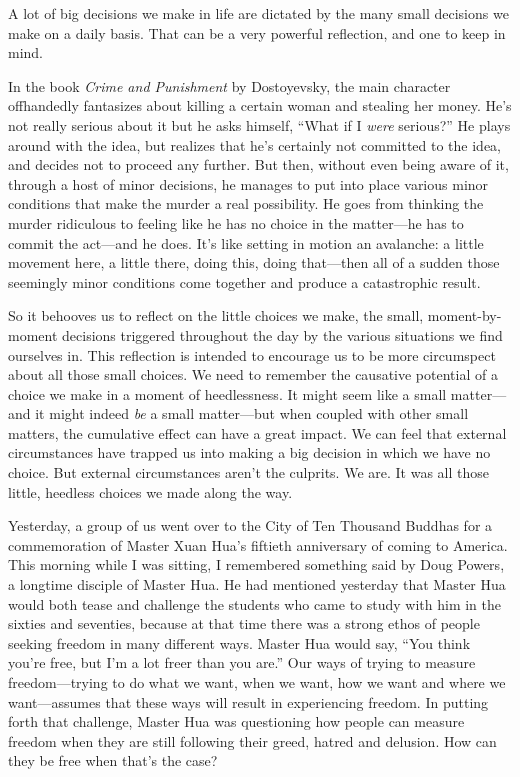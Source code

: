 
A lot of big decisions we make in life are dictated by the many small 
decisions we make on a daily basis. That can be a very powerful 
reflection, and one to keep in mind.

In the book \emph{Crime and Punishment} by Dostoyevsky, the main 
character offhandedly fantasizes about killing a certain woman and 
stealing her money. He's not really serious about it but he asks 
himself, ``What if I \emph{were} serious?'' He plays around with the 
idea, but realizes that he's certainly not committed to the idea, and 
decides not to proceed any further. But then, without even being aware 
of it, through a host of minor decisions, he manages to put into place 
various minor conditions that make the murder a real possibility. He 
goes from thinking the murder ridiculous to feeling like he has no 
choice in the matter---he has to commit the act---and he does. It's 
like setting in motion an avalanche: a little movement here, a little 
there, doing this, doing that---then all of a sudden those seemingly 
minor conditions come together and produce a catastrophic result.

So it behooves us to reflect on the little choices we make, the small, 
moment-by-moment decisions triggered throughout the day by the various 
situations we find ourselves in. This reflection is intended to 
encourage us to be more circumspect about all those small choices. We 
need to remember the causative potential of a choice we make in a 
moment of heedlessness. It might seem like a small matter---and it 
might indeed \emph{be} a small matter---but when coupled with other 
small matters, the cumulative effect can have a great impact. We can 
feel that external circumstances have trapped us into making a big 
decision in which we have no choice. But external circumstances aren't 
the culprits. We are. It was all those little, heedless choices we made 
along the way.


Yesterday, a group of us went over to the City of Ten Thousand Buddhas 
for a commemoration of Master Xuan Hua's fiftieth anniversary of coming 
to America. This morning while I was sitting, I remembered something 
said by Doug Powers, a longtime disciple of Master Hua. He had 
mentioned yesterday that Master Hua would both tease and challenge the 
students who came to study with him in the sixties and seventies, 
because at that time there was a strong ethos of people seeking freedom 
in many different ways. Master Hua would say, ``You think you're free, 
but I'm a lot freer than you are.'' Our ways of trying to measure 
freedom---trying to do what we want, when we want, how we want and 
where we want---assumes that these ways will result in experiencing 
freedom. In putting forth that challenge, Master Hua was questioning 
how people can measure freedom when they are still following their 
greed, hatred and delusion. How can they be free when that's the case?

